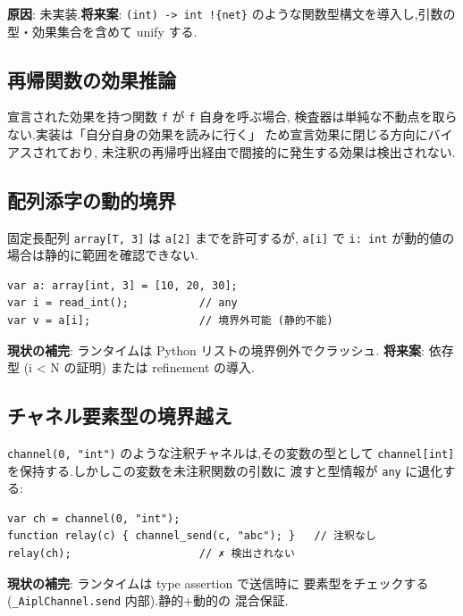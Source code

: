 \documentclass[11pt,a4paper]{article}
\newcommand{\code}[1]{\texttt{\small #1}}
\begin{document}
\textbf{原因}: 未実装.\textbf{将来案}: \code{(int) -> int !\{net\}}
のような関数型構文を導入し,引数の型・効果集合を含めて unify する.

\subsection{再帰関数の効果推論}

宣言された効果を持つ関数 \code{f} が \code{f} 自身を呼ぶ場合,
検査器は単純な不動点を取らない.実装は「自分自身の効果を読みに行く」
ため宣言効果に閉じる方向にバイアスされており,
未注釈の再帰呼出経由で間接的に発生する効果は検出されない.

\subsection{配列添字の動的境界}

固定長配列 \code{array[T, 3]} は \code{a[2]} までを許可するが,
\code{a[i]} で \code{i: int} が動的値の場合は静的に範囲を確認できない.

\begin{lstlisting}
var a: array[int, 3] = [10, 20, 30];
var i = read_int();           // any
var v = a[i];                 // 境界外可能 (静的不能)
\end{lstlisting}

\textbf{現状の補完}: ランタイムは Python リストの境界例外でクラッシュ.
\textbf{将来案}: 依存型 (i < N の証明) または refinement の導入.

\subsection{チャネル要素型の境界越え}

\code{channel(0, "int")} のような注釈チャネルは,その変数の型として
\code{channel[int]} を保持する.しかしこの変数を未注釈関数の引数に
渡すと型情報が \code{any} に退化する:

\begin{lstlisting}
var ch = channel(0, "int");
function relay(c) { channel_send(c, "abc"); }   // 注釈なし
relay(ch);                    // ✗ 検出されない
\end{lstlisting}

\textbf{現状の補完}: ランタイムは type assertion で送信時に
要素型をチェックする (\code{\_AiplChannel.send} 内部).静的+動的の
混合保証.
\end{document}

